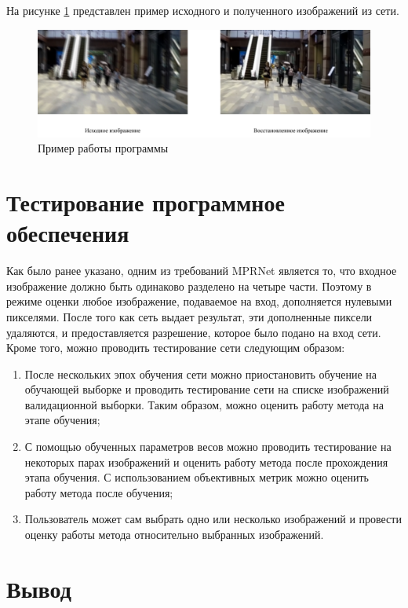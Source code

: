 На рисунке \ref{fig:demo} представлен пример исходного и полученного изображений из сети.
\begin{figure}[H]
    \centering
    \includegraphics[width=1.0\textwidth]{assets/predict-result.png}
    \caption{Пример работы программы}
    \label{fig:demo}
\end{figure}

\section{Тестирование программное обеспечения}

Как было ранее указано, одним из требований MPRNet является то, что входное изображение должно быть одинаково разделено на четыре части. Поэтому в режиме оценки любое изображение, подаваемое на вход, дополняется нулевыми пикселями. После того как сеть выдает результат, эти дополненные пиксели удаляются, и предоставляется разрешение, которое было подано на вход сети. Кроме того, можно проводить тестирование сети следующим образом:

\begin{enumerate}
    \item После нескольких эпох обучения сети можно приостановить обучение на обучающей выборке и проводить тестирование сети на списке изображений валидационной выборки. Таким образом, можно оценить работу метода на этапе обучения;
    \item С помощью обученных параметров весов можно проводить тестирование на некоторых парах изображений и оценить работу метода после прохождения этапа обучения. С использованием объективных метрик можно оценить работу метода после обучения;
    \item Пользователь может сам выбрать одно или несколько изображений и провести оценку работы метода относительно выбранных изображений.
\end{enumerate}

\section*{Вывод}

